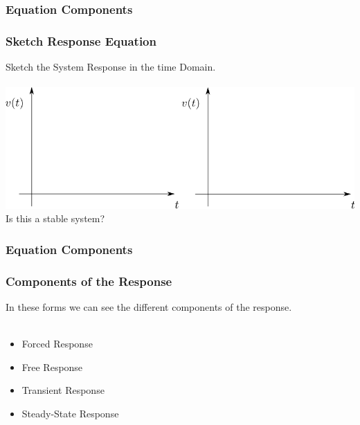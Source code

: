 \documentclass[fleqn]{beamer} %
\newcommand{\sectionIsubsectionIVtitle}{Equation Components}
\begin{document}
			\begin{frame}
				\frametitle{\sectionIsubsectionIVtitle}
				\bigskip

				\frametitle{Sketch Response Equation}

				\large Sketch the System Response in the time Domain.  \vspace{3mm}\\

				  \vspace{3mm}\\

				\includegraphics[scale=0.5]{images/lecture1_fig1.png} \\

				\large Is this a stable system?\\

				
		
				\btVFill
			\end{frame}	

			\begin{frame}
				\frametitle{\sectionIsubsectionIVtitle}
				\bigskip

				\frametitle{Components of the Response}

				\large In these forms we can see the different components of the response.\vspace{3mm}\\

				 \vspace{3mm}\\


				\large
				\begin{itemize}

				\item Forced Response\\

				\item Free Response\\

				\item Transient Response\\

				\item Steady-State Response

				\end{itemize}

			
				\btVFill
			\end{frame}	
\end{document}
